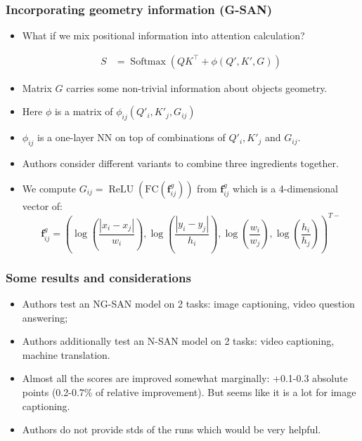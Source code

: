 \documentclass[10pt]{beamer}
\begin{document}
\begin{frame}
    \frametitle{Incorporating geometry information (G-SAN)}
    \begin{itemize}
        \item What if we mix positional information into attention calculation?

\begin{equation}
\begin{aligned}
S &=\operatorname{Softmax}\left(Q K^{\top} + \phi(Q', K', G) \right)
\end{aligned}
\end{equation}
    \item\pause Matrix $G$ carries some non-trivial information about objects geometry.
    \item\pause Here $\phi$ is a matrix of $\phi_{ij}(Q'_i, K'_j, G_{ij})$ 
    \item\pause $\phi_{ij}$ is a one-layer NN on top of combinations of $Q'_i, K'_j$ and $G_{ij}$.
    \item\pause Authors consider different variants to combine three ingredients together.
    \item\pause We compute $G_{i j}=\operatorname{ReLU}\left(\mathrm{FC}\left(\mathbf{f}_{i j}^{g}\right)\right)$ from $\mathbf{f}_{i j}^{g}$ which is a 4-dimensional vector of:
\begin{equation}
\mathbf{f}_{i j}^{g}=\left(\log \left(\frac{\left|x_{i}-x_{j}\right|}{w_{i}}\right), \log \left(\frac{\left|y_{i}-y_{j}\right|}{h_{i}}\right), \log \left(\frac{w_{i}}{w_{j}}\right), \log \left(\frac{h_{i}}{h_{j}}\right)\right)^{T-}
\end{equation}
    \end{itemize}
\end{frame}

\begin{frame}
    \frametitle{Some results and considerations}
    \begin{itemize}
        \item\pause Authors test an NG-SAN model on 2 tasks: image captioning, video question answering;
        \item\pause Authors additionally test an N-SAN model on 2 tasks: video captioning, machine translation.
        \item\pause Almost all the scores are improved somewhat marginally: +0.1-0.3 absolute points (0.2-0.7\% of relative improvement). But seems like it is a lot for image captioning.
        \item\pause Authors do not provide stds of the runs which would be very helpful.
    \end{itemize}
\end{frame}
\end{document}

